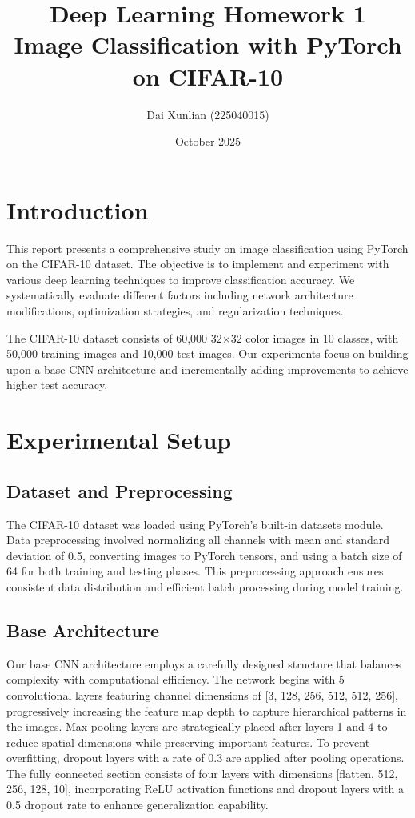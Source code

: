 \documentclass{article}
\title{Deep Learning Homework 1 \\ Image Classification with PyTorch on CIFAR-10}
\author{Dai Xunlian (225040015)}
\date{October 2025}
\begin{document}
\maketitle

\section{Introduction}

This report presents a comprehensive study on image classification using PyTorch on the CIFAR-10 dataset. The objective is to implement and experiment with various deep learning techniques to improve classification accuracy. We systematically evaluate different factors including network architecture modifications, optimization strategies, and regularization techniques.

The CIFAR-10 dataset consists of 60,000 32×32 color images in 10 classes, with 50,000 training images and 10,000 test images. Our experiments focus on building upon a base CNN architecture and incrementally adding improvements to achieve higher test accuracy.

\section{Experimental Setup}

\subsection{Dataset and Preprocessing}

The CIFAR-10 dataset was loaded using PyTorch's built-in datasets module. Data preprocessing involved normalizing all channels with mean and standard deviation of 0.5, converting images to PyTorch tensors, and using a batch size of 64 for both training and testing phases. This preprocessing approach ensures consistent data distribution and efficient batch processing during model training.

\subsection{Base Architecture}

Our base CNN architecture employs a carefully designed structure that balances complexity with computational efficiency. The network begins with 5 convolutional layers featuring channel dimensions of [3, 128, 256, 512, 512, 256], progressively increasing the feature map depth to capture hierarchical patterns in the images. Max pooling layers are strategically placed after layers 1 and 4 to reduce spatial dimensions while preserving important features. To prevent overfitting, dropout layers with a rate of 0.3 are applied after pooling operations. The fully connected section consists of four layers with dimensions [flatten, 512, 256, 128, 10], incorporating ReLU activation functions and dropout layers with a 0.5 dropout rate to enhance generalization capability.
\end{document}
